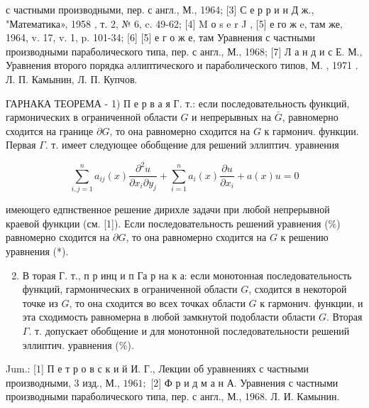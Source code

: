 \documentclass[10pt]{article}
\begin{document}
с частными производными, пер. с англ., М., 1964; [3] С е р р и н Д ж., "Математика», 1958 , т. 2, № 6, c. 49-62; [4] M о s e r J , [5] е го ж e, там же, 1964, v. 17, v. 1, p. 101-34; [6] [5] е г о ж е, там Уравнения с частными производными параболического типа, пер. с англ., М., 1968; [7] Л а н д и с Е. М., Уравнения второго порядка әллиптического и параболического типов, М. , 1971 . Л. П. Камынин, Л. П. Купчов.



ГАРНАКА ТЕОРЕМА - 1) П е р в а я Г. т.: если последовательность функций, гармонических в ограниченной области $G$ и непрерывных на $\bar{G}$, равномерно сходится на границе $\partial G$, то она равномерно сходится на $G$ к гармонич. функции. Первая $\Gamma$. т. имеет следующее обобщение для решений эллиптич. уравнения



\[

\sum_{i, j=1}^{n} a_{i j}(x) \frac{\partial^{2} u}{\partial x_{i} \partial y_{j}}+\sum_{i=1}^{n} a_{i}(x) \frac{\partial u}{\partial x_{i}}+a(x) u=0

\]



имеющего едпнственное решение дирихле задачи при любой непрерывной краевой функции (см. [1]). Если последовательность решений уравнения (\%) равномерно сходится на $\partial G$, то она равномерно сходится на $G$ к решению уравнения (*).



\begin{enumerate}

  \setcounter{enumi}{1}

  \item В торая Г. т., п р инц и п Га р на к а: если монотонная последовательность функций, гармонических в ограниченной области $G$, сходится в некоторой точке из $G$, то она сходится во всех точках области $G$ к гармонич. функции, и эта сходимость равномерна в любой замкнутой подобласти области $G$. Вторая $\Gamma$. т. допускает обобщение и для монотонной последовательности решений эллиптич. уравнения (\%).

\end{enumerate}



Jum.: [1] П е т р о в с к и й И. Г., Лекции об уравнениях с частными производными, 3 изд., М., $1961 ;$ [2] Ф р и д м а н А. Уравнения с частными производными параболического типа, пер. с англ., М., 1968. Л. И. Камынин.
\end{document}
